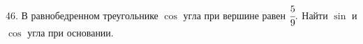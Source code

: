 46. В равнобедренном треугольнике $\cos$ угла при вершине равен $\cfrac{5}{9}.$ Найти $\sin$ и $\cos$ угла при основании.\\
